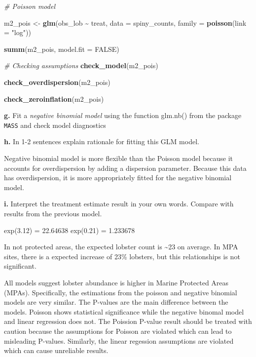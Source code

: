 \documentclass[
]{article}
\newenvironment{Shaded}{\begin{snugshade}}{\end{snugshade}}
\newcommand{\AttributeTok}[1]{\textcolor[rgb]{0.13,0.29,0.53}{#1}}
\newcommand{\CommentTok}[1]{\textcolor[rgb]{0.56,0.35,0.01}{\textit{#1}}}
\newcommand{\ConstantTok}[1]{\textcolor[rgb]{0.56,0.35,0.01}{#1}}
\newcommand{\FunctionTok}[1]{\textcolor[rgb]{0.13,0.29,0.53}{\textbf{#1}}}
\newcommand{\NormalTok}[1]{#1}
\newcommand{\OtherTok}[1]{\textcolor[rgb]{0.56,0.35,0.01}{#1}}
\newcommand{\SpecialCharTok}[1]{\textcolor[rgb]{0.81,0.36,0.00}{\textbf{#1}}}
\newcommand{\StringTok}[1]{\textcolor[rgb]{0.31,0.60,0.02}{#1}}
\begin{document}
\begin{Shaded}
\begin{Highlighting}[]
\CommentTok{\# Poisson model }

\NormalTok{m2\_pois }\OtherTok{\textless{}{-}} \FunctionTok{glm}\NormalTok{(obs\_lob }\SpecialCharTok{\textasciitilde{}}\NormalTok{ treat, }\AttributeTok{data =}\NormalTok{ spiny\_counts, }\AttributeTok{family =} \FunctionTok{poisson}\NormalTok{(}\AttributeTok{link =} \StringTok{"log"}\NormalTok{))}

\FunctionTok{summ}\NormalTok{(m2\_pois, }\AttributeTok{model.fit =} \ConstantTok{FALSE}\NormalTok{)}
\end{Highlighting}
\end{Shaded}

\begin{Shaded}
\begin{Highlighting}[]
\CommentTok{\# Checking assumptions}
\FunctionTok{check\_model}\NormalTok{(m2\_pois)}

\FunctionTok{check\_overdispersion}\NormalTok{(m2\_pois)}

\FunctionTok{check\_zeroinflation}\NormalTok{(m2\_pois)}
\end{Highlighting}
\end{Shaded}

\textbf{g.} Fit a \emph{negative binomial model} using the function
glm.nb() from the package \texttt{MASS} and check model diagnostics

\textbf{h.} In 1-2 sentences explain rationale for fitting this GLM
model.

Negative binomial model is more flexible than the Poisson model because
it accounts for overdispersion by adding a dispersion parameter. Because
this data has overdispersion, it is more appropriately fitted for the
negative binomial model.

\textbf{i.} Interpret the treatment estimate result in your own words.
Compare with results from the previous model.

exp(3.12) = 22.64638 exp(0.21) = 1.233678

In not protected areas, the expected lobster count is \textasciitilde23
on average. In MPA sites, there is a expected increase of 23\% lobsters,
but this relationships is not significant.

All models suggest lobster abundance is higher in Marine Protected Areas
(MPAs). Specifically, the estimations from the poisson and negative
binomial models are very similar. The P-values are the main difference
between the models. Poisson shows statistical significance while the
negative binomal model and linear regression does not. The Poission
P-value result should be treated with caution because the assumptions
for Poisson are violated which can lead to misleading P-values.
Similarly, the linear regession assumptions are violated which can cause
unreliable results.
\end{document}
